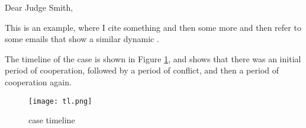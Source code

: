 \documentclass[12pt]{article}
\begin{document}
\noindent Dear Judge Smith,

This is an example, where I cite something  and then some more  and then refer to some emails that show a similar dynamic . 

The timeline of the case is shown in Figure \ref{fig:tl}, and shows that there was an initial period of cooperation, followed by a period of conflict, and then a period of cooperation again.
\begin{figure}[!h]
    \centering
    \texttt{[image: tl.png]}
    \caption{case timeline}
    \label{fig:tl}
\end{figure}
\end{document}
